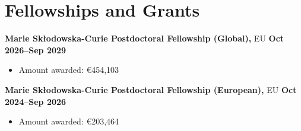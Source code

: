 \section{Fellowships and Grants}

\textbf{Marie Sk{\l}odowska-Curie Postdoctoral Fellowship (Global),} EU
\hfill \textbf{Oct 2026--Sep 2029}%
%
\vspace*{0.05in}
\begin{itemize}
    \item[] Amount awarded: \euro 454,103
\end{itemize}

\textbf{Marie Sk{\l}odowska-Curie Postdoctoral Fellowship (European),} EU
\hfill \textbf{Oct 2024--Sep 2026}%
%
\vspace*{0.05in}
\begin{itemize}
    \item[] Amount awarded: \euro 203,464
\end{itemize}

